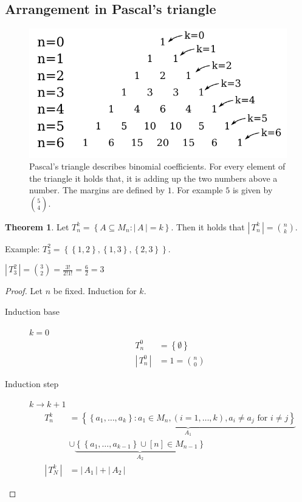 \documentclass[a4paper,landscape,twocolumn]{article}
\theoremstyle{definition}
\newtheorem{theorem}{Theorem}
\newcommand\set[1]{\left\{#1\right\}}
\newcommand\card[1]{\left|\,#1\,\right|}
\begin{document}
\subsection{Arrangement in Pascal's triangle}
\begin{figure}[!h]
  \begin{center}
    \includegraphics{img/pascals_triangle.pdf}
    \caption{
      Pascal's triangle describes binomial coefficients.
      For every element of the triangle it holds that,
      it is adding up the two numbers above a number.
      The margins are defined by $1$. For example $5$ is given by ${5 \choose 4}$.
    }
  \end{center}
\end{figure}

\begin{theorem}
  Let $T_n^k = \set{A \subseteq M_n: \card{A} = k}$.
  Then it holds that $\card{T_n^k} = \binom nk$.

  Example: $T_3^2 = \set{\set{1, 2}, \set{1, 3}, \set{2, 3}}$.

  $\card{T_3^2} = \binom 32 = \frac{3!}{2! 1!} = \frac 62 = 3$
\end{theorem}

\begin{proof}
  Let $n$ be fixed. Induction for $k$.
  \begin{description}
    \item[Induction base] $k=0$
      \begin{align*}
        T_n^0        &= \set{\emptyset} \\
        \card{T_n^0} &= 1 = \binom n0
      \end{align*}
    \item[Induction step] $k\rightarrow k+1$
      \begin{align*}
        T_n^k &= \underbrace{\set{\set{a_1, \ldots, a_k}: a_1 \in M_n, (i = 1, \ldots, k), a_i \neq a_j \text{ for } i \neq j}}_{A_1} \\
              &\cup \underbrace{\set{\set{a_1, \ldots, a_{k-1}} \cup [n] \in M_{n-1}}}_{A_2} \\
        \card{T_N^k} &= \card{A_1} + \card{A_2}
      \end{align*}
  \end{description}
\end{proof}
\end{document}
